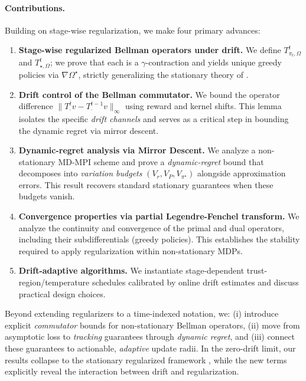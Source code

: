 \documentclass{article}
\theoremstyle{plain}
\theoremstyle{definition}
\theoremstyle{remark}
\newcommand{\1}{\mathbbm{1}}
\begin{document}
\paragraph{Contributions.} Building on stage-wise regularization, we make four primary advances:
\begin{enumerate}[leftmargin=*,itemsep=2pt,topsep=2pt]
\item \textbf{Stage-wise regularized Bellman operators under drift.} We define $T^t_{\pi_t,\Omega}$ and $T^t_{\star,\Omega}$; we prove that each is a $\gamma$-contraction and yields unique greedy policies via $\nabla\Omega^\star$, strictly generalizing the stationary theory of \cite{geist2019theory}.
\item \textbf{Drift control of the Bellman commutator.} We bound the operator difference $\|T^t_\cdot v - T^{t-1}_\cdot v\|_\infty$ using reward and kernel shifts. This lemma isolates the specific \emph{drift channels} and serves as a critical step in bounding the dynamic regret via mirror descent.
\item \textbf{Dynamic-regret analysis via Mirror Descent.} We analyze a non-stationary MD-MPI scheme and prove a \emph{dynamic-regret} bound that decomposes into \emph{variation budgets} $(V_r,V_P,V_{\pi^\star})$ alongside approximation errors. This result recovers standard stationary guarantees when these budgets vanish.
\item \textbf{Convergence properties via partial Legendre-Fenchel transform.} We analyze the continuity and convergence of the primal and dual operators, including their subdifferentials (greedy policies). This establishes the stability required to apply regularization within non-stationary MDPs.
\item \textbf{Drift-adaptive algorithms.} We instantiate stage-dependent trust-region/temperature schedules calibrated by online drift estimates and discuss practical design choices.
\end{enumerate}

Beyond extending regularizers to a time-indexed notation, we: (i) introduce explicit \emph{commutator} bounds for non-stationary Bellman operators, (ii) move from asymptotic loss to \emph{tracking} guarantees through \emph{dynamic regret}, and (iii) connect these guarantees to actionable, \emph{adaptive} update radii. In the zero-drift limit, our results collapse to the stationary regularized framework \cite{geist2019theory}, while the new terms explicitly reveal the interaction between drift and regularization.
\end{document}
